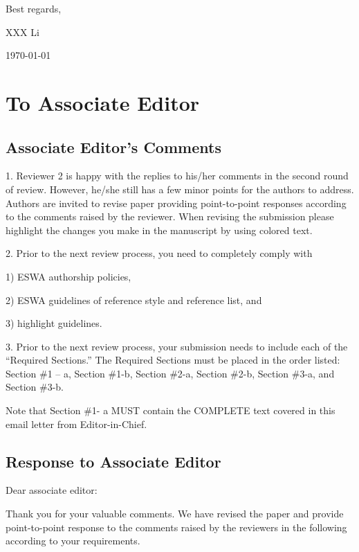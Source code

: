 \documentclass[12pt, review, authoryear]{elsarticle}
\newcounter{reviewer}
\newcounter{point}[reviewer]
\def\mydate{\today} %
\begin{document}
\noindent Best regards,

\noindent XXX Li

\noindent \mydate

\section{To Associate Editor}
\subsection{Associate Editor’s Comments}
1. Reviewer 2 is happy with the replies to his/her comments in the second round of review. However, he/she still has a few minor points for the authors to address. Authors are invited to revise paper providing point-to-point responses according to the comments raised by the reviewer. When revising the submission please highlight the changes you make in the manuscript by using colored text.

2. Prior to the next review process, you need to completely comply with

1) ESWA authorship policies,

2) ESWA guidelines of reference style and reference list, and

3) highlight guidelines.

3. Prior to the next review process, your submission needs to include each of the “Required Sections.” The Required Sections must be placed in the order listed: Section \#1 – a, Section \#1-b, Section \#2-a, Section \#2-b, Section \#3-a, and Section \#3-b.   

Note that Section \#1- a MUST contain the COMPLETE text covered in this email letter from Editor-in-Chief.



\subsection{Response to Associate Editor}
\noindent Dear associate editor:

Thank you for your valuable comments. We have revised the paper and provide point-to-point response to the comments raised by the reviewers in the following according to your requirements.
\end{document}

